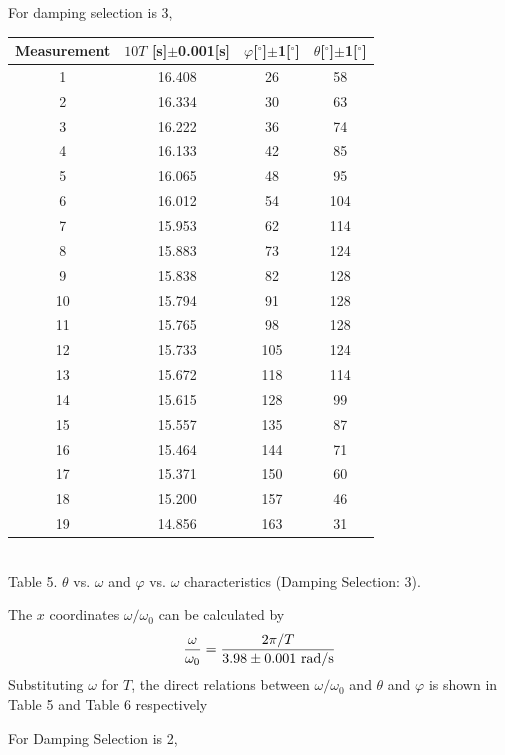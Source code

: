 \documentclass[a4paper]{report}
\begin{document}
	For damping selection is 3,
	
	\begin{center}
		\begin{tabular}{|c|c|c|c|}
			\hline
			Measurement&$10T$ [s]$\pm$0.001[s] &$\varphi$[$^\circ$]$\pm$1[$^\circ$]&$\theta$[$^\circ$]$\pm$1[$^\circ$]\\
			\hline
			1&16.408&26&58\\
			\hline
			2&16.334&30&63\\
			\hline
			3&16.222&36&74\\
			\hline
			4&16.133&42&85\\
			\hline
			5&16.065&48&95\\
			\hline
			6&16.012&54&104\\
			\hline
			7&15.953&62&114\\
			\hline
			8&15.883&73&124\\
			\hline
			9&15.838&82&128\\
			\hline
			10&15.794&91&128\\
			\hline
			11&15.765&98&128\\
			\hline
			12&15.733&105&124\\
			\hline
			13&15.672&118&114\\
			\hline
			14&15.615&128&99\\
			\hline
			15&15.557&135&87\\
			\hline
			16&15.464&144&71\\
			\hline
			17&15.371&150&60\\
			\hline
			18&15.200&157&46\\
			\hline
			19&14.856&163&31\\
			\hline
		\end{tabular}
		\vspace{0.5cm}
		\\Table 5. $\theta$ vs. $\omega$ and $\varphi$ vs. $\omega$ characteristics (Damping Selection: 3).
	\end{center}
	The $x$ coordinates $\omega/\omega_0$ can be calculated by
	\begin{equation*}
	\dfrac{\omega}{\omega_0}=\dfrac{2\pi/T}{3.98\pm0.001\  \rm{rad/s}}
	\end{equation*}
	Substituting $\omega$ for $T$, the direct relations between $\omega/\omega_0$ and $\theta$ and $\varphi$ is shown in Table 5 and Table 6 respectively
	
	For Damping Selection is 2,
	
\end{document}
